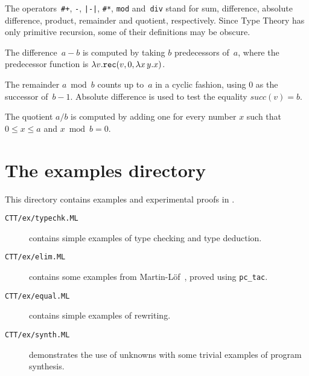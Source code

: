 The operators~\verb'#+', \verb'-', \verb'|-|', \verb'#*', \verb'mod'
and~\verb'div' stand for sum, difference, absolute difference, product,
remainder and quotient, respectively.  Since Type Theory has only primitive
recursion, some of their definitions may be obscure.  

The difference~$a-b$ is computed by taking $b$ predecessors of~$a$, where
the predecessor function is $\lambda v. {\tt rec}(v, 0, \lambda x\,y.x)$.

The remainder $a\bmod b$ counts up to~$a$ in a cyclic fashion, using 0
as the successor of~$b-1$.  Absolute difference is used to test the
equality $succ(v)=b$.

The quotient $a/b$ is computed by adding one for every number $x$
such that $0\leq x \leq a$ and $x\bmod b = 0$.



\section{The examples directory}
This directory contains examples and experimental proofs in {\CTT}.
\begin{description}
\item[{\tt CTT/ex/typechk.ML}]
contains simple examples of type checking and type deduction.

\item[{\tt CTT/ex/elim.ML}]
contains some examples from Martin-L\"of~\cite{martinlof84}, proved using 
{\tt pc_tac}.

\item[{\tt CTT/ex/equal.ML}]
contains simple examples of rewriting.

\item[{\tt CTT/ex/synth.ML}]
demonstrates the use of unknowns with some trivial examples of program
synthesis. 
\end{description}


